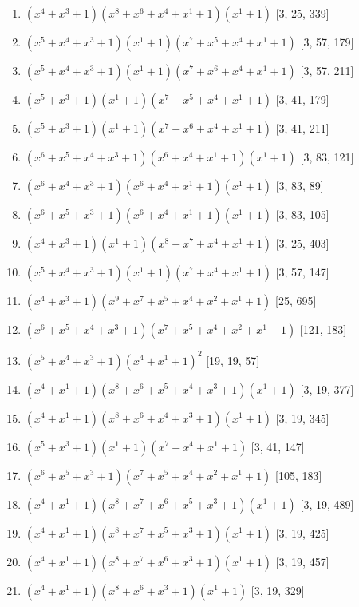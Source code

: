\documentclass[10pt,twocolumn]{article}
\begin{document}
\begin{enumerate}
\item $(x^{4} + x^{3} + 1)(x^{8} + x^{6} + x^{4} + x^{1} + 1)(x^{1} + 1)$  [3, 25, 339]
\item $(x^{5} + x^{4} + x^{3} + 1)(x^{1} + 1)(x^{7} + x^{5} + x^{4} + x^{1} + 1)$  [3, 57, 179]
\item $(x^{5} + x^{4} + x^{3} + 1)(x^{1} + 1)(x^{7} + x^{6} + x^{4} + x^{1} + 1)$  [3, 57, 211]
\item $(x^{5} + x^{3} + 1)(x^{1} + 1)(x^{7} + x^{5} + x^{4} + x^{1} + 1)$  [3, 41, 179]
\item $(x^{5} + x^{3} + 1)(x^{1} + 1)(x^{7} + x^{6} + x^{4} + x^{1} + 1)$  [3, 41, 211]
\item $(x^{6} + x^{5} + x^{4} + x^{3} + 1)(x^{6} + x^{4} + x^{1} + 1)(x^{1} + 1)$  [3, 83, 121]
\item $(x^{6} + x^{4} + x^{3} + 1)(x^{6} + x^{4} + x^{1} + 1)(x^{1} + 1)$  [3, 83, 89]
\item $(x^{6} + x^{5} + x^{3} + 1)(x^{6} + x^{4} + x^{1} + 1)(x^{1} + 1)$  [3, 83, 105]
\item $(x^{4} + x^{3} + 1)(x^{1} + 1)(x^{8} + x^{7} + x^{4} + x^{1} + 1)$  [3, 25, 403]
\item $(x^{5} + x^{4} + x^{3} + 1)(x^{1} + 1)(x^{7} + x^{4} + x^{1} + 1)$  [3, 57, 147]
\item $(x^{4} + x^{3} + 1)(x^{9} + x^{7} + x^{5} + x^{4} + x^{2} + x^{1} + 1)$  [25, 695]
\item $(x^{6} + x^{5} + x^{4} + x^{3} + 1)(x^{7} + x^{5} + x^{4} + x^{2} + x^{1} + 1)$  [121, 183]
\item $(x^{5} + x^{4} + x^{3} + 1)(x^{4} + x^{1} + 1)^{2}$  [19, 19, 57]
\item $(x^{4} + x^{1} + 1)(x^{8} + x^{6} + x^{5} + x^{4} + x^{3} + 1)(x^{1} + 1)$  [3, 19, 377]
\item $(x^{4} + x^{1} + 1)(x^{8} + x^{6} + x^{4} + x^{3} + 1)(x^{1} + 1)$  [3, 19, 345]
\item $(x^{5} + x^{3} + 1)(x^{1} + 1)(x^{7} + x^{4} + x^{1} + 1)$  [3, 41, 147]
\item $(x^{6} + x^{5} + x^{3} + 1)(x^{7} + x^{5} + x^{4} + x^{2} + x^{1} + 1)$  [105, 183]
\item $(x^{4} + x^{1} + 1)(x^{8} + x^{7} + x^{6} + x^{5} + x^{3} + 1)(x^{1} + 1)$  [3, 19, 489]
\item $(x^{4} + x^{1} + 1)(x^{8} + x^{7} + x^{5} + x^{3} + 1)(x^{1} + 1)$  [3, 19, 425]
\item $(x^{4} + x^{1} + 1)(x^{8} + x^{7} + x^{6} + x^{3} + 1)(x^{1} + 1)$  [3, 19, 457]
\item $(x^{4} + x^{1} + 1)(x^{8} + x^{6} + x^{3} + 1)(x^{1} + 1)$  [3, 19, 329]

\end{enumerate}
\end{document}
